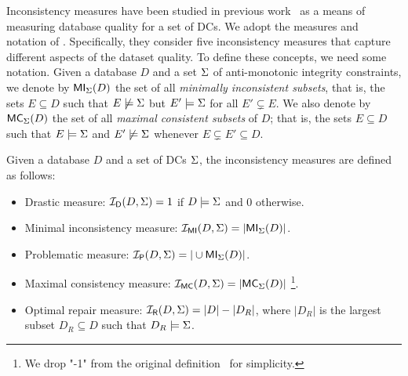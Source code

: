 Inconsistency measures have been studied in previous work~\cite{DBLP:conf/sum/Bertossi18,DBLP:conf/ecsqaru/GrantH13,DBLP:journals/ijar/GrantH23,LivshitsK22,LivshitsBKS20} as a means of measuring database quality for a set of DCs. 
We adopt the measures and notation of \citet{LivshitsKTIKR21}. Specifically, they consider five inconsistency measures that capture different aspects of the dataset quality. To define these concepts, we need some notation. Given a database $D$ and a set ${\Sigma}$ of anti-monotonic integrity constraints, we denote by $\mathord{\mathsf{MI}}_{{\Sigma}}(D)$ the set of all \emph{minimally inconsistent subsets}, that is, the sets $E \subseteq D$ such that $E \not\models {\Sigma}$ but $E' \models {\Sigma}$ for all $E' \subsetneq E$. We also denote by $\mathord{\mathsf{MC}}_{{\Sigma}}(D)$ the set of all \emph{maximal consistent subsets} of $D$; that is, the sets $E \subseteq D$ such that $E \models {\Sigma}$ and $E' \not\models {\Sigma}$ whenever $E \subsetneq E' \subseteq D$. 


\begin{definition}\label{def:inconsistencymeasure}
Given a database $D$ and a set of DCs ${\Sigma}$, the inconsistency measures are defined as follows:
\begin{itemize}
    \item Drastic measure: $\mathcal{I_\mathsf{D}}(D, {\Sigma}) = 1$ if $D \models {\Sigma}$ and 0 otherwise.
    \item Minimal inconsistency measure:  $\mathcal{I_{\mathsf{MI}}}(D,{\Sigma}) = |\mathord{\mathsf{MI}}_{{\Sigma}}(D)|$.
    \item Problematic measure: $\mathcal{I_\mathsf{P}}(D,{\Sigma}) = |\cup \mathord{\mathsf{MI}}_{{\Sigma}}(D)|$.
    \item Maximal consistency measure: $\mathcal{I_\mathsf{MC}}(D,{\Sigma}) = |\mathord{\mathsf{MC}}_{{\Sigma}}(D)|$ \footnote{We drop "-1" from the original definition~\cite{LivshitsKTIKR21} for simplicity.}.
    \item Optimal repair measure: $\mathcal{I_\mathsf{R}}(D,{\Sigma}) = |D| - |D_R|$, where $|D_R|$ is the largest subset $D_R \subseteq D$ such that $D_R \models {\Sigma}$.
\end{itemize}
\end{definition}

